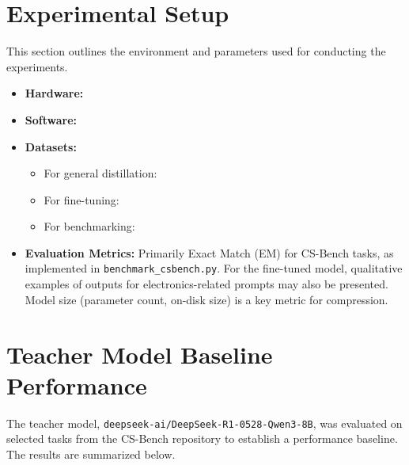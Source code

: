 \documentclass[12pt, a4paper]{report}
\begin{document}
\section{Experimental Setup}
\label{sec:experimental_setup}
This section outlines the environment and parameters used for conducting the experiments.
\begin{itemize}
    \item \textbf{Hardware:} %
    \item \textbf{Software:} %
    \item \textbf{Datasets:}
        \begin{itemize}
            \item For general distillation: %
            \item For fine-tuning: %
            \item For benchmarking: %
        \end{itemize}
    \item \textbf{Evaluation Metrics:} Primarily Exact Match (EM) for CS-Bench tasks, as implemented in \texttt{benchmark\_csbench.py}. For the fine-tuned model, qualitative examples of outputs for electronics-related prompts may also be presented. Model size (parameter count, on-disk size) is a key metric for compression.
\end{itemize}

\section{Teacher Model Baseline Performance}
\label{sec:teacher_baseline}
The teacher model, \texttt{deepseek-ai/DeepSeek-R1-0528-Qwen3-8B}, was evaluated on selected tasks from the CS-Bench repository to establish a performance baseline. The results are summarized below.
\end{document}
